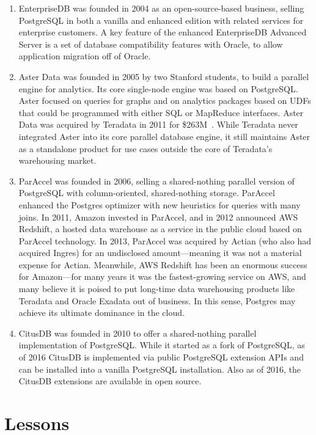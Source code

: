 \documentclass[sigconf,natbib=false]{acmart}
\begin{document}
\begin{enumerate}[1. ]
\item EnterpriseDB was founded in 2004 as an open-source-based business, selling PostgreSQL in both a vanilla and enhanced edition with related services for enterprise customers. A key feature of the enhanced EnterpriseDB Advanced Server is a set of database compatibility features with Oracle, to allow application migration off of Oracle.

\item Aster Data was founded in 2005 by two Stanford students, to build a parallel engine for analytics. Its core single-node engine was based on PostgreSQL. Aster focused on queries for graphs and on analytics packages based on UDFs that could be programmed with either SQL or MapReduce interfaces. Aster Data was acquired by Teradata in 2011 for \$263M~\cite{aster}. While Teradata never integrated Aster into its core parallel database engine, it still maintains Aster as a standalone product for use cases outside the core of Teradata's warehousing market.

\item ParAccel was founded in 2006, selling a shared-nothing parallel version of PostgreSQL with column-oriented, shared-nothing storage. ParAccel enhanced the Postgres optimizer with new heuristics for queries with many joins. In 2011, Amazon invested in ParAccel, and in 2012 announced AWS Redshift, a hosted data warehouse as a service in the public cloud based on ParAccel technology. In 2013, ParAccel was acquired by Actian (who also had acquired Ingres) for an undisclosed amount---meaning it was not a material expense for Actian. Meanwhile, AWS Redshift has been an enormous success for Amazon---for many years it was the fastest-growing service on AWS, and many believe it is poised to put long-time data warehousing products like Teradata and Oracle Exadata out of business. In this sense, Postgres may achieve its ultimate dominance in the cloud.

\item CitusDB was founded in 2010 to offer a shared-nothing parallel implementation of PostgreSQL. While it started as a fork of PostgreSQL, as of 2016 CitusDB is implemented via public PostgreSQL extension APIs and can be installed into a vanilla PostgreSQL installation. Also as of 2016, the CitusDB extensions are available in open source. 

\end{enumerate}
\section{Lessons}
\end{document}

